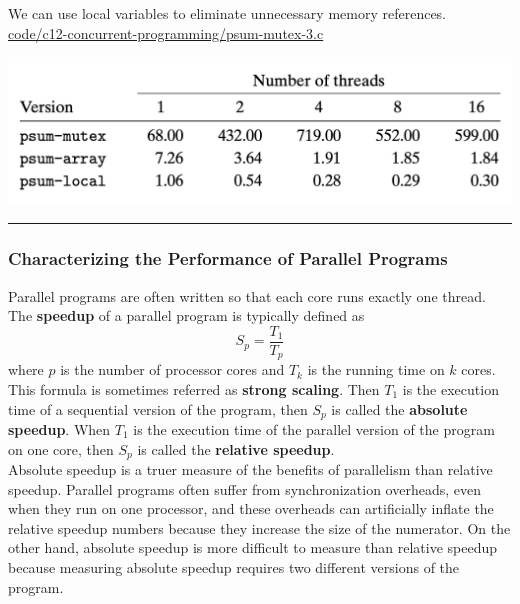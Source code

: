 \documentclass[11pt]{article}
\begin{document}
We can use local variables to eliminate unnecessary memory references.\\

\url{code/c12-concurrent-programming/psum-mutex-3.c}\\

\begin{center}
\includegraphics[width=.9\linewidth]{pics/number-of-threads-3.png}
\end{center}


\noindent\rule{\textwidth}{0.5pt}


\subsubsection{Characterizing the Performance of Parallel Programs}
\label{sec:orgba3d6d3}

Parallel programs are often written so that each core runs exactly one thread.\\

The \textbf{speedup} of a parallel program is typically defined as\\
\begin{equation}
S_p = \frac{T_1}{T_p}
\end{equation}
where \(p\) is the number of processor cores and \(T_k\) is the running time on \(k\) cores. This formula is sometimes referred as \textbf{strong scaling}. Then \(T_1\) is the execution time of a sequential version of the program, then \(S_p\) is called the \textbf{absolute speedup}. When \(T_1\) is the execution time of the parallel version of the program on one core, then \(S_p\) is called the \textbf{relative speedup}.\\

Absolute speedup is a truer measure of the benefits of parallelism than relative speedup. Parallel programs often suffer from synchronization overheads, even when they run on one processor, and these overheads can artificially inflate the relative speedup numbers because they increase the size of the numerator. On the other hand, absolute speedup is more difficult to measure than relative speedup because measuring absolute speedup requires two different versions of the program.\\
\end{document}

